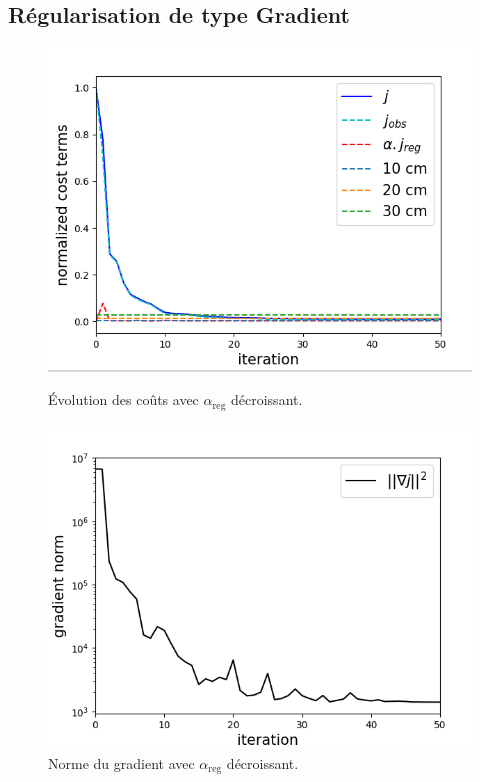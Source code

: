 \documentclass{article}
\begin{document}
\subsection{Régularisation de type Gradient}

\begin{figure}[H]
    \centering
    \begin{minipage}[b]{0.48\linewidth}
        \centering
        \includegraphics[width=\linewidth]{Images_Ayoub/With_Regularisation/Gradient/Costs.png}
        \caption{Évolution des coûts avec \(\alpha_{\text{reg}}\) décroissant.}
        \label{fig:dec-costs}
    \end{minipage}
    \hfill
    \begin{minipage}[b]{0.48\linewidth}
        \centering
        \includegraphics[width=\linewidth]{Images_Ayoub/With_Regularisation/Gradient/Gradient.png}
        \caption{Norme du gradient avec \(\alpha_{\text{reg}}\) décroissant.}
        \label{fig:dec-gradient}
    \end{minipage}
    

\end{figure}
\end{document}

